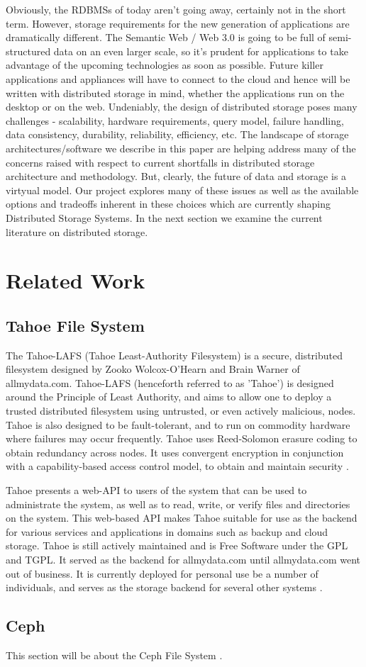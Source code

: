 \documentclass[11pt]{article}
\begin{document}
Obviously, the RDBMSs of today aren't going away, certainly not in the short term. However, 
storage requirements for the new generation of applications are dramatically different. 
The Semantic Web / Web 3.0 is going to be full of semi-structured data on an even larger 
scale, so it's prudent for applications to take advantage of the upcoming technologies as 
soon as possible. Future killer applications and appliances will have to connect to the 
cloud and hence will be written with distributed storage in mind, whether the applications 
run on the desktop or on the web. Undeniably, the design of distributed storage poses many 
challenges - scalability, hardware requirements, query model, failure handling, data 
consistency, durability, reliability, efficiency, etc. The landscape of storage 
architectures/software we describe in this paper are helping address many of the concerns 
raised with respect to current shortfalls in distributed storage architecture and methodology. 
But, clearly, the future of data and storage is a virtyual model. Our project explores many 
of these issues as well as the available options and tradeoffs inherent in these choices 
which are currently shaping Distributed Storage Systems. In the next section we examine 
the current literature on distributed storage.

\section{Related Work}
\subsection{Tahoe File System}

The Tahoe-LAFS (Tahoe Least-Authority Filesystem) is a secure,
distributed filesystem designed by Zooko Wolcox-O'Hearn and Brain
Warner of allmydata.com. Tahoe-LAFS (henceforth referred to as
'Tahoe') is designed around the Principle of Least Authority, and aims
to allow one to deploy a trusted distributed filesystem using
untrusted, or even actively malicious, nodes. Tahoe is also designed
to be fault-tolerant, and to run on commodity hardware where failures
may occur frequently. Tahoe uses Reed-Solomon erasure coding to obtain
redundancy across nodes. It uses convergent encryption in conjunction
with a capability-based access control model, to obtain and maintain
security \cite{WilcoxOHearn:2008p1275}.

Tahoe presents a web-API to users of the system that can be used to
administrate the system, as well as to read, write, or verify files
and directories on the system. This web-based API makes Tahoe suitable
for use as the backend for various services and applications in
domains such as backup and cloud storage. Tahoe is still actively
maintained and is Free Software under the GPL and TGPL. It served as the
backend for allmydata.com until allmydata.com went out of business. It
is currently deployed for personal use be a number of individuals, and
serves as the storage backend for several other
systems \cite{tahoe-lafs.org}. 

\subsection{Ceph}
This section will be about the Ceph File System
\cite{Weil:2012p1035,Weil:2012p1010,Weil:2006p1273}.

\nocite{*}

\end{document}
